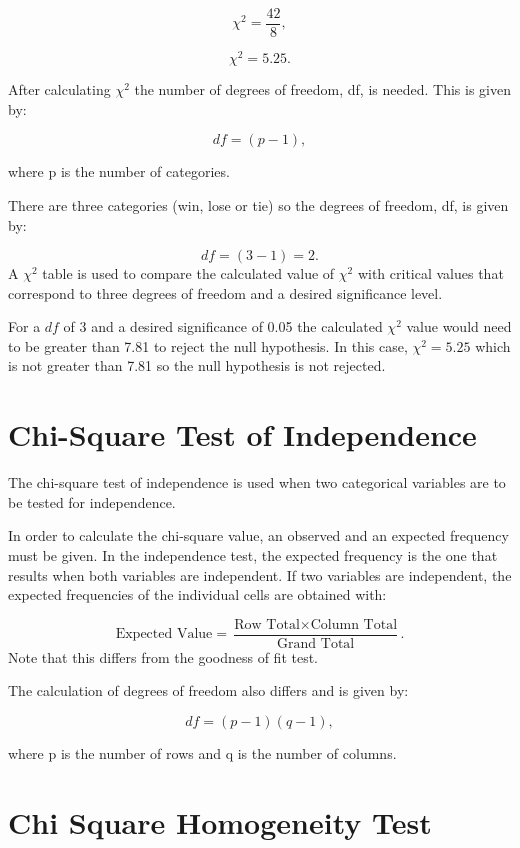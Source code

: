 \documentclass[
]{book}
\begin{document}
\[\chi^2=\frac{42}{8},\]

\[\chi^2=5.25.\]

After calculating \(\chi^2\) the number of degrees of freedom, df, is needed. This is given by:

\[df=(p-1),\]

where p is the number of categories.

There are three categories (win, lose or tie) so the degrees of freedom, df, is given by:

\[df=(3-1)=2.\]
A \(\chi^2\) table is used to compare the calculated value of \(\chi^2\) with critical values that correspond to three degrees of freedom and a desired significance level.

For a \(df\) of 3 and a desired significance of 0.05 the calculated \(\chi^2\) value would need to be greater than 7.81 to reject the null hypothesis. In this case, \(\chi^2=5.25\) which is not greater than 7.81 so the null hypothesis is not rejected.

\hypertarget{chi-square-test-of-independence}{%
\section{Chi-Square Test of Independence}\label{chi-square-test-of-independence}}

The chi-square test of independence is used when two categorical variables are to be tested for independence.

In order to calculate the chi-square value, an observed and an expected frequency must be given. In the independence test, the expected frequency is the one that results when both variables are independent. If two variables are independent, the expected frequencies of the individual cells are obtained with:

\[\textrm{Expected Value}= \frac{\textrm{Row Total} \times \textrm{Column Total}}{\textrm{Grand Total}}.\]
Note that this differs from the goodness of fit test.

The calculation of degrees of freedom also differs and is given by:

\[df=(p-1)(q-1),\]

where p is the number of rows and q is the number of columns.

\hypertarget{chi-square-homogeneity-test}{%
\section{Chi Square Homogeneity Test}\label{chi-square-homogeneity-test}}
\end{document}
